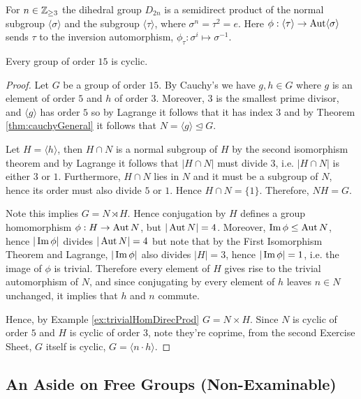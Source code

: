 \begin{example}
  For $n\in\mathbb Z_{\geq 3}$ the dihedral group $D_{2n}$ is a semidirect product of the normal
  subgroup $\langle \sigma \rangle$ and the subgroup $\langle \tau \rangle$, where $\sigma
  ^n=\tau^2=e$. Here $\phi:\langle \tau \rangle\to \operatorname{Aut} \langle \sigma \rangle$ sends
  $\tau$ to the inversion automorphism, $\phi_{\tau}:\sigma^i\mapsto \sigma^{-1}$.
\end{example}

\begin{theorem}
  Every group of order $15$ is cyclic.
  \label{<+label+>}
\end{theorem}
\begin{proof}
  Let $G$ be a group of order $15$. By Cauchy's we have $g, h\in G$ where $g$ is an
  element of order $5$ and $h$ of order $3$. Moreover, $3$ is the smallest prime divisor,
  and $\langle g \rangle$ has order $5$ so by Lagrange it follows that it has index $3$
  and by Theorem \ref{thm:cauchyGeneral} it follows that $N=\langle g
  \rangle\trianglelefteq G$. 

  Let $H=\langle h \rangle$, then $H\cap N$ is a normal subgroup of
  $H$ by the second isomorphism theorem and by Lagrange it follows that $|H\cap N|$ must
  divide $3$, i.e. $|H\cap N|$ is either $3$ or $1$. Furthermore, $H\cap N$ lies in $N$
  and it must be a subgroup of $N$, hence its order must also divide $5$ or $1$. Hence
  $H\cap N=\{1\}$. Therefore, $NH=G$. 

  Note this implies $G= N\rtimes H$. Hence conjugation by $H$
  defines a group homomorphism $\phi:H\to\operatorname{Aut} N$, but $|\operatorname{Aut} N|=4$. Moreover, $\operatorname{Im}\phi
  \leq \operatorname{Aut} N$, hence $|\operatorname{Im}\phi|$ divides $|\operatorname{Aut} N|=4$ but note that by the First
  Isomorphism Theorem and Lagrange, $|\operatorname{Im} \phi|$ also divides $|H|=3$, hence
  $|\operatorname{Im}\phi|=1$, i.e. the image of $\phi$ is trivial. Therefore every element of $H$
  gives rise to the trivial automorphism of $N$, and since conjugating by every element of
  $h$ leaves $n\in N$ unchanged, it implies that $h$ and $n$ commute.

  Hence, by Example \ref{ex:trivialHomDirecProd} $G=N\times H$. Since $N$ is cyclic of
  order $5$ and $H$ is cyclic of order $3$, note they're coprime, from the second Exercise
  Sheet, $G$ itself is cyclic, $G=\langle n\cdot h \rangle$.
\end{proof}

\subsection{An Aside on Free Groups (Non-Examinable)}

